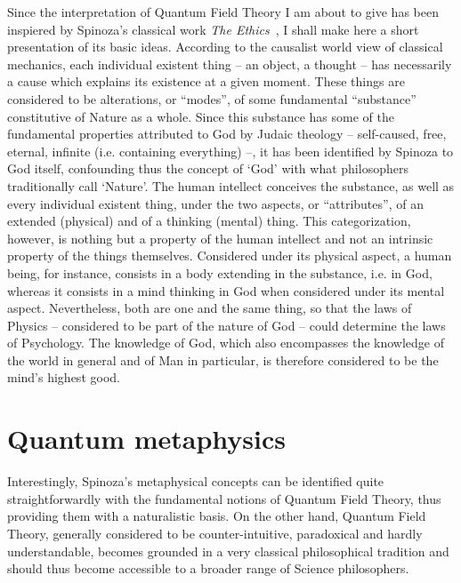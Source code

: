 \documentclass[10pt,a4paper,twoside,openany]{book}
\begin{document}
Since the interpretation of Quantum Field Theory I am about to give has been inspiered by Spinoza's classical work \textit{The Ethics}~\cite{Spinoza1677}, I shall make here a short presentation of its basic ideas. According to the causalist world view of classical mechanics, each individual existent thing -- an object, a thought -- has necessarily a cause which explains its existence at a given moment. These things are considered to be alterations, or ``modes'', of some fundamental ``substance'' constitutive of Nature as a whole. Since this substance has some of the fundamental properties attributed to God by Judaic theology -- self-caused, free, eternal, infinite (i.e. containing everything) --, it has been identified by Spinoza to God itself, confounding thus the concept of `God' with what philosophers traditionally call `Nature'. The human intellect conceives the substance, as well as every individual existent thing, under the two aspects, or ``attributes'', of an extended (physical) and of a thinking (mental) thing. This categorization, however, is nothing but a property of the human intellect and not an intrinsic property of the things themselves. Considered under its physical aspect, a human being, for instance, consists in a body extending in the substance, i.e. in God, whereas it consists in a mind thinking in God when considered under its mental aspect. Nevertheless, both are one and the same thing, so that the laws of Physics -- considered to be part of the nature of God -- could determine the laws of Psychology. The knowledge of God, which also encompasses the knowledge of the world in general and of Man in particular, is therefore considered to be the mind's highest good.

\section{Quantum metaphysics}

Interestingly, Spinoza's metaphysical concepts can be identified quite straightforwardly with the fundamental notions of Quantum Field Theory, thus providing them with a naturalistic basis. On the other hand, Quantum Field Theory, generally considered to be counter-intuitive, paradoxical and hardly understandable, becomes grounded in a very classical philosophical tradition and should thus become accessible to a broader range of Science philosophers.
\end{document}
